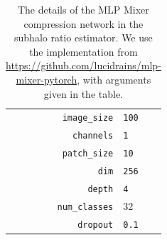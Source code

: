 \begin{subappendices}
\begin{table}
    \centering
    \begin{tabular}{r l}
        \toprule
        \texttt{image\_size} & \texttt{100} \\
        \texttt{channels} & \texttt{1} \\
        \texttt{patch\_size} & \texttt{10}\\
        \texttt{dim} & \texttt{256} \\
        \texttt{depth} & \texttt{4} \\
        \texttt{num\_classes} & 32 \\
        \texttt{dropout} & \texttt{0.1} \\
        \bottomrule
    \end{tabular}
    \label{tab:sl-mixer}
    \caption{The details of the MLP Mixer compression network in the subhalo ratio estimator. We use the implementation from \url{https://github.com/lucidrains/mlp-mixer-pytorch}, with arguments given in the table.}
\end{table}

\end{subappendices}
